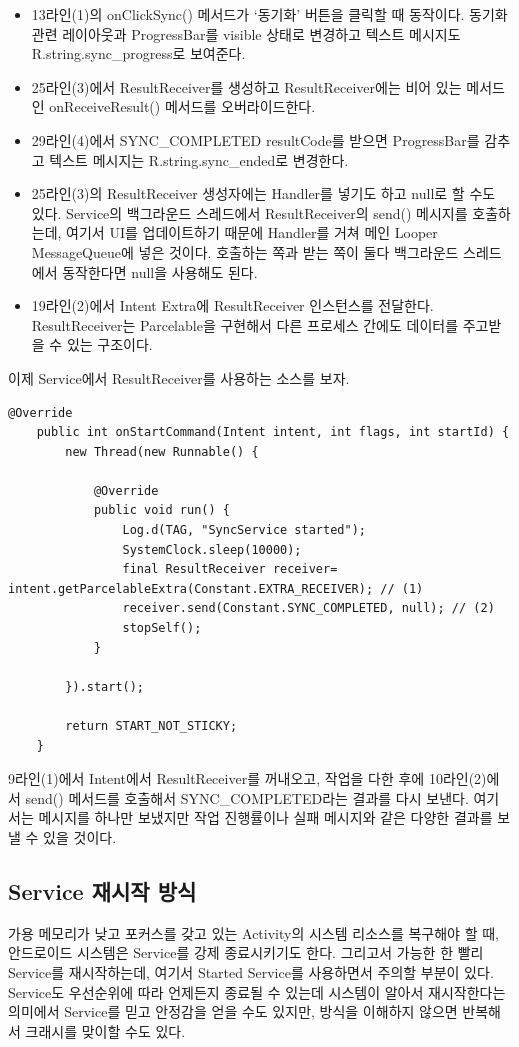 \begin{itemize}
\item 13라인(1)의 onClickSync() 메서드가 `동기화' 버튼을 클릭할 때 동작이다. 동기화 관련 레이아웃과 ProgressBar를 visible 상태로 변경하고 텍스트 메시지도  R.string.sync\_progress로 보여준다.
\item 25라인(3)에서 ResultReceiver를 생성하고 ResultReceiver에는 비어 있는 메서드인 onReceiveResult() 메서드를 오버라이드한다. 
\item 29라인(4)에서 SYNC\_COMPLETED resultCode를 받으면 ProgressBar를 감추고 텍스트 메시지는 R.string.sync\_ended로 변경한다. 
\item 25라인(3)의 ResultReceiver 생성자에는 Handler를 넣기도 하고 null로 할 수도 있다. Service의 백그라운드 스레드에서 ResultReceiver의 send() 메시지를 호출하는데, 여기서 UI를 업데이트하기 때문에 Handler를 거쳐 메인 Looper MessageQueue에 넣은 것이다. 호출하는 쪽과 받는 쪽이 둘다 백그라운드 스레드에서 동작한다면 null을 사용해도 된다.
\item 19라인(2)에서 Intent Extra에 ResultReceiver 인스턴스를 전달한다. ResultReceiver는 Parcelable을 구현해서 다른 프로세스 간에도 데이터를 주고받을 수 있는 구조이다.
\end{itemize}

이제 Service에서 ResultReceiver를 사용하는  소스를 보자.
\begin{lstlisting}[frame=single]
	@Override
	public int onStartCommand(Intent intent, int flags, int startId) {
   		new Thread(new Runnable() {
      
      		@Override
     		public void run() {
         		Log.d(TAG, "SyncService started");
         		SystemClock.sleep(10000);
         		final ResultReceiver receiver= intent.getParcelableExtra(Constant.EXTRA_RECEIVER); // (1)
         		receiver.send(Constant.SYNC_COMPLETED, null); // (2)
         		stopSelf();
     		}

   		}).start();
   
   		return START_NOT_STICKY;
	}
\end{lstlisting}	
9라인(1)에서 Intent에서 ResultReceiver를 꺼내오고, 작업을 다한 후에 10라인(2)에서 send() 메서드를 호출해서 SYNC\_COMPLETED라는 결과를 다시 보낸다. 여기서는 메시지를 하나만 보냈지만 작업 진행률이나 실패 메시지와 같은 다양한 결과를 보낼 수 있을 것이다.

\subsection{Service 재시작 방식}
가용 메모리가 낮고 포커스를 갖고 있는 Activity의 시스템 리소스를 복구해야 할 때, 안드로이드 시스템은 Service를 강제 종료시키기도 한다. 
그리고서 가능한 한 빨리 Service를 재시작하는데, 여기서 Started Service를 사용하면서 주의할 부분이 있다.
Service도 우선순위에 따라 언제든지 종료될 수 있는데 시스템이 알아서 재시작한다는 의미에서 Service를 믿고 안정감을 얻을 수도 있지만, 방식을 이해하지 않으면 반복해서 크래시를 맞이할 수도 있다.\\

